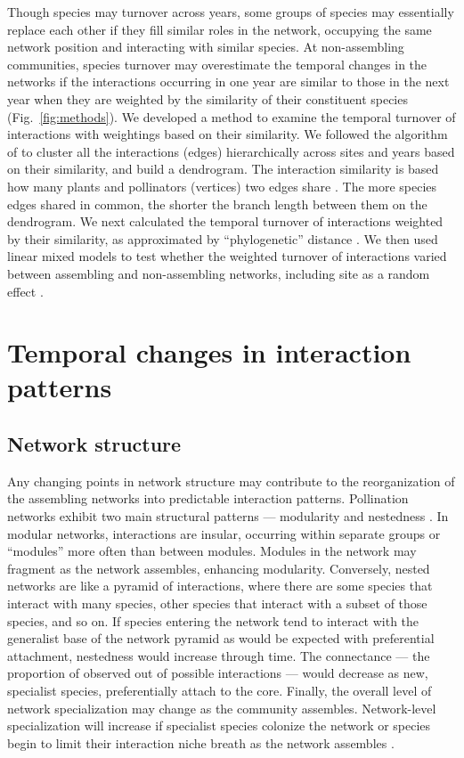 \documentclass[12pt]{article}
\begin{document}
Though species may turnover across years, some groups of species may
essentially replace each other if they fill similar roles in the
network, occupying the same network position and interacting with
similar species. At non-assembling communities, species turnover may
overestimate the temporal changes in the networks if the interactions
occurring in one year are similar to those in the next year when they
are weighted by the similarity of their constituent species
(Fig.~\ref{fig:methods}). We developed a method to examine the
temporal turnover of interactions with weightings based on their
similarity. We followed the algorithm of \cite{ahn2010link} to cluster
all the interactions (edges) hierarchically across sites and years
based on their similarity, and build a dendrogram. The interaction
similarity is based how many plants and pollinators (vertices) two
edges share \citep{ahn2010link, kalinka2011linkcomm}. The more species
edges shared in common, the shorter the branch length between them on
the dendrogram.  We next calculated the temporal turnover of
interactions weighted by their similarity, as approximated by
``phylogenetic'' distance \citep{graham2008phylogenetic,
  picante-2010-1463}. We then used linear mixed models to test whether
the weighted turnover of interactions varied between assembling and
non-assembling networks, including site as a random effect
\citep{lme4, lmetest}.

\section*{Temporal changes in interaction patterns}

\subsection*{Network structure}
Any changing points in network structure may contribute to the
reorganization of the assembling networks into predictable interaction
patterns. Pollination networks exhibit two main structural patterns
--- modularity \citep[e.g.,][]{Olesen2007} and nestedness
\citep[e.g.,][]{Bascompte2006, Bascompte2003}. In modular networks,
interactions are insular, occurring within separate groups or
``modules'' more often than between modules. Modules in the network
may fragment as the network assembles, enhancing
modularity. Conversely, nested networks are like a pyramid of
interactions, where there are some species that interact with many
species, other species that interact with a subset of those species,
and so on. If species entering the network tend to interact with the
generalist base of the network pyramid as would be expected with
preferential attachment, nestedness would increase through time. The
connectance --- the proportion of observed out of possible
interactions --- would decrease as new, specialist species,
preferentially attach to the core. Finally, the overall level of
network specialization may change as the community
assembles. Network-level specialization will increase if specialist
species colonize the network or species begin to limit their
interaction niche breath as the network assembles
\citep{bluthgen-2006-9}.
\end{document}
